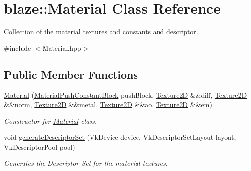 \hypertarget{classblaze_1_1Material}{}\section{blaze\+:\+:Material Class Reference}
\label{classblaze_1_1Material}


Collection of the material textures and constants and descriptor.  




{\ttfamily \#include $<$Material.\+hpp$>$}

\subsection*{Public Member Functions}
\begin{DoxyCompactItemize}
\item 
\hyperlink{classblaze_1_1Material_a8454802956b05e99d5811c6288a50510}{Material} (\hyperlink{structblaze_1_1MaterialPushConstantBlock}{Material\+Push\+Constant\+Block} push\+Block, \hyperlink{classblaze_1_1Texture2D}{Texture2D} \&\&diff, \hyperlink{classblaze_1_1Texture2D}{Texture2D} \&\&norm, \hyperlink{classblaze_1_1Texture2D}{Texture2D} \&\&metal, \hyperlink{classblaze_1_1Texture2D}{Texture2D} \&\&ao, \hyperlink{classblaze_1_1Texture2D}{Texture2D} \&\&em)
\begin{DoxyCompactList}\small\item\em Constructor for \hyperlink{classblaze_1_1Material}{Material} class. \end{DoxyCompactList}\item 
void \hyperlink{classblaze_1_1Material_adfd5e759f847aef4e7cc3ee94f987e59}{generate\+Descriptor\+Set} (Vk\+Device device, Vk\+Descriptor\+Set\+Layout layout, Vk\+Descriptor\+Pool pool)
\begin{DoxyCompactList}\small\item\em Generates the Descriptor Set for the material textures. \end{DoxyCompactList}\end{DoxyCompactItemize}
